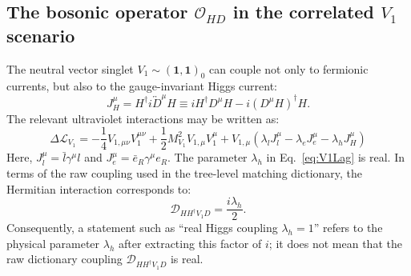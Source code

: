 
\subsection{The bosonic operator $\mathcal O_{HD}$ in the correlated
$V_1$ scenario}
\label{sec:v1-chd}

The neutral vector singlet
$V_1\sim(\mathbf 1,\mathbf 1)_0$ can couple not only to fermionic
currents, but also to the gauge-invariant Higgs current:
\begin{equation}
    J_H^\mu
    =H^\dagger i\overleftrightarrow{D}^{\mu}H
    \equiv
    iH^\dagger D^\mu H-i(D^\mu H)^\dagger H.
    \label{eq:v1-higgs-current}
\end{equation}
The relevant ultraviolet interactions may be written as:
\begin{equation}
    \Delta\mathcal L_{V_1}
    =-\frac14 V_{1,\mu\nu}V_1^{\mu\nu}
      +\frac12M_{V_1}^2V_{1,\mu}V_1^\mu
      +V_{1,\mu}
       \left(
          \lambda_l J_l^\mu
          -\lambda_e J_e^\mu
          -\lambda_hJ_H^\mu
       \right)\label{eq:V1Lag}
\end{equation}
Here, $J_l^\mu=\bar l\gamma^\mu l$ and
$J_e^\mu=\bar e_R\gamma^\mu e_R$.  The parameter $\lambda_h$ in
Eq.~\eqref{eq:V1Lag} is real.  In terms of the raw
coupling used in the tree-level matching dictionary, the Hermitian
interaction corresponds to:
\begin{equation}
    \mathcal D_{HH^\dagger V_1D}=\frac{i\lambda_h}{2}.
    \label{eq:v1-dictionary-h-coupling}
\end{equation}
Consequently, a statement such as ``real Higgs coupling $\lambda_h=1$'' refers to
the physical parameter $\lambda_h$ after extracting this factor of $i$; it does
not mean that the raw dictionary coupling
$\mathcal D_{HH^\dagger V_1D}$ is real.

